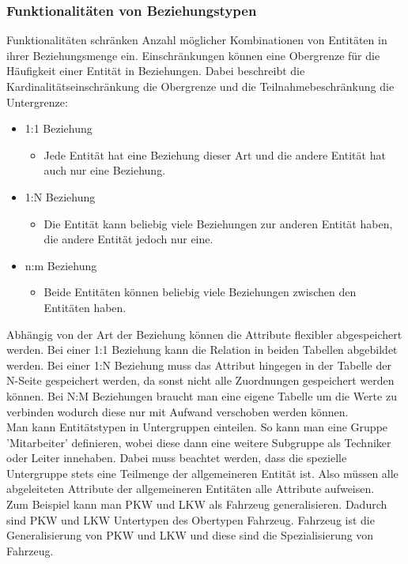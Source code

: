 \documentclass{article}
\begin{document}
	\subsubsection{Funktionalitäten von Beziehungstypen}
	Funktionalitäten schränken Anzahl möglicher Kombinationen von Entitäten in ihrer Beziehungsmenge ein. Einschränkungen können eine Obergrenze für die Häufigkeit einer Entität in Beziehungen. Dabei beschreibt die Kardinalitätseinschränkung die Obergrenze und die Teilnahmebeschränkung die Untergrenze:
	\begin{itemize}
		\item{1:1 Beziehung}
		\begin{itemize}
			\item{Jede Entität hat eine Beziehung dieser Art und die andere Entität hat auch nur eine Beziehung.}
		\end{itemize}
		\item{1:N Beziehung}
		\begin{itemize}
			\item{Die Entität kann beliebig viele Beziehungen zur anderen Entität haben, die andere Entität jedoch nur eine.}
		\end{itemize}
		\item{n:m Beziehung}
		\begin{itemize}
			\item{Beide Entitäten können beliebig viele Beziehungen zwischen den Entitäten haben.}
		\end{itemize}
	\end{itemize}
	Abhängig von der Art der Beziehung können die Attribute flexibler abgespeichert werden. Bei einer 1:1 Beziehung kann die Relation in beiden Tabellen abgebildet werden. Bei einer 1:N Beziehung muss das Attribut hingegen in der Tabelle der N-Seite gespeichert werden, da sonst nicht alle Zuordnungen gespeichert werden können. Bei N:M Beziehungen braucht man eine eigene Tabelle um die Werte zu verbinden wodurch diese nur mit Aufwand verschoben werden können. \\
	Man kann Entitätstypen in Untergruppen einteilen. So kann man eine Gruppe 'Mitarbeiter' definieren, wobei diese dann eine weitere Subgruppe als Techniker oder Leiter innehaben. Dabei muss beachtet werden, dass die spezielle Untergruppe stets eine Teilmenge der allgemeineren Entität ist. Also müssen alle abgeleiteten Attribute der allgemeineren Entitäten alle Attribute aufweisen. \\
	Zum Beispiel kann man PKW und LKW als Fahrzeug generalisieren. Dadurch sind PKW und LKW Untertypen des Obertypen Fahrzeug. Fahrzeug ist die Generalisierung von PKW und LKW und diese sind die Spezialisierung von Fahrzeug. \\
\end{document}
